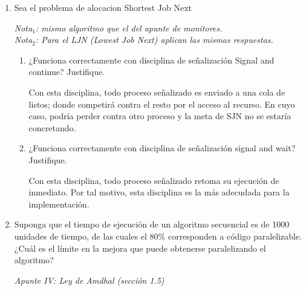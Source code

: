 \documentclass[a4paper, 10pt]{article}
\newenvironment{QandA}{
    \begin{enumerate}\bfseries}
    {\end{enumerate}
}
\newenvironment{answered}{\par\normalfont}{}
\begin{document}
\begin{QandA}

\item Sea el problema de alocacion Shortest Job Next
\begin{answered}
\emph{Nota$_1$: mismo algoritmo que el del apunte de monitores.}
\\
\emph{Nota$_2$: Para el LJN (Lowest Job Next) aplican las mismas respuestas.}
\end{answered}
\begin{enumerate}
\item ¿Funciona correctamente con disciplina de señalización Signal and continue? Justifique.
\begin{answered}
Con esta disciplina, todo proceso señalizado es enviado a una cola de listos; donde competirá contra el resto por el acceso al recurso. En cuyo caso, podría perder contra otro proceso y la meta de SJN no se estaría concretando.
\end{answered}
\item ¿Funciona correctamente con disciplina de señalización signal and wait? Justifique.
\begin{answered}
Con esta disciplina, todo proceso señalizado retoma su ejecución de inmediato. Por tal motivo, esta disciplina es la más adecudada para la implementación.    
\end{answered}
\end{enumerate}


\item Suponga que el tiempo de ejecución de un algoritmo secuencial es de 1000 unidades de tiempo, de las cuales el 80\% corresponden a código paralelizable. ¿Cuál es el límite en la mejora que puede obtenerse  paralelizando el algoritmo?

\begin{answered}
    \emph{Apunte IV: Ley de Amdhal (sección 1.5)}
\end{answered}



\end{QandA}
\end{document}
